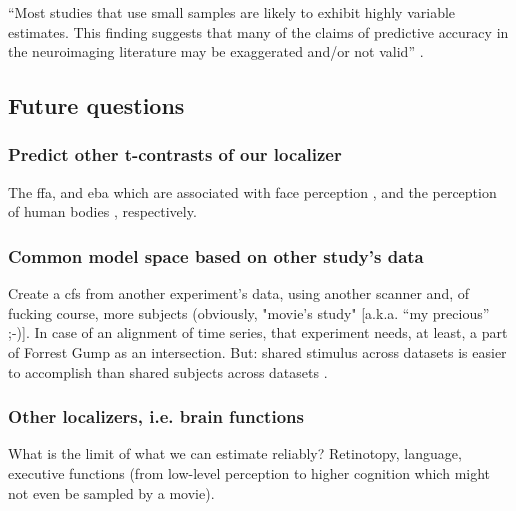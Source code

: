 ``Most studies that use small samples are likely to exhibit highly variable
estimates. This finding suggests that many of the claims of predictive accuracy
in the neuroimaging literature may be exaggerated and/or not valid''
\citep{poldrack2019establishment}.





\subsection{Future questions}


\subsubsection{Predict other t-contrasts of our localizer}


%
The \ac{ffa}, and \ac{eba}  which are associated with face perception
\citep{kanwisher1997ffa, pitcher2011occipitalfacearea}, and the perception of
human bodies \citep{downing2001bodyarea}, respectively.




\subsubsection{Common model space based on other study's data}

%
Create a \ac{cfs} from another experiment's data, using another
scanner and, of fucking course, more subjects (obviously, "movie's study"
[a.k.a. ``my precious'' ;-)].
%
In case of an alignment of time series, that experiment needs, at least, a part
of Forrest Gump as an intersection.
%
But: shared stimulus across datasets is easier to accomplish than shared
subjects across datasets \citep[s.][]{zhang2018transfer}.



\subsubsection{Other localizers, i.e. brain functions}

%
What is the limit of what we can estimate reliably?
%
Retinotopy, language, executive functions (from low-level perception to higher
cognition which might not even be sampled by a movie).


